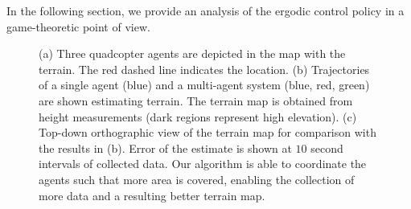 \documentclass[letterpaper, 10 pt, conference]{ieeeconf}  %
\begin{document}
In the following section, we provide an analysis of the ergodic control policy in a game-theoretic point of view.


\begin{figure}[thpb]
\centering
{}
\caption{
(a) Three quadcopter agents are depicted in the map with the terrain. The red dashed line indicates the location.
(b) Trajectories of a single agent (blue) and a multi-agent system (blue, red, green) are shown estimating terrain. The terrain map is obtained from height measurements (dark regions represent high elevation).
(c) Top-down orthographic view of the terrain map for comparison with the results in (b). 
Error of the estimate is shown at $10$ second intervals of collected data. 
Our algorithm is able to coordinate the agents such that more area is covered, enabling the collection of more data and a resulting better terrain map.}
\label{fig:mapping_results}
\end{figure}
\end{document}

